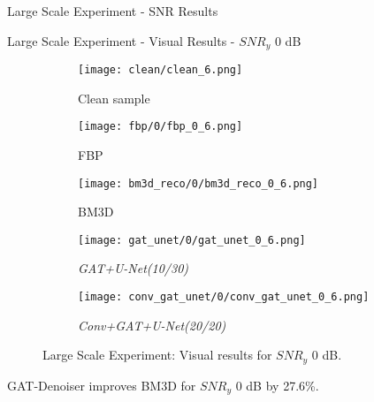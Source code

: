 \begin{frame}{Large Scale Experiment - SNR Results}
    
\end{frame}

\begin{frame}{Large Scale Experiment - Visual Results - $SNR_y$ 0 dB}
\begin{figure}
    \captionsetup[subfigure]{justification=centering}
    \centering
    \begin{subfigure}[t]{0.18\textwidth}
      \texttt{[image: clean/clean\_6.png]}
      \caption{Clean sample}
    \end{subfigure} \hfill
    \begin{subfigure}[t]{0.18\textwidth}
      \texttt{[image: fbp/0/fbp\_0\_6.png]}
      \caption{FBP}
    \end{subfigure} \hfill
    \begin{subfigure}[t]{0.18\textwidth}
      \texttt{[image: bm3d\_reco/0/bm3d\_reco\_0\_6.png]}
      \caption{BM3D}
    \end{subfigure} \hfill
    \begin{subfigure}[t]{0.18\textwidth}
      \texttt{[image: gat\_unet/0/gat\_unet\_0\_6.png]}
      \caption{\textit{GAT+U-Net(10/30)}}
    \end{subfigure} \hfill
    \begin{subfigure}[t]{0.18\textwidth}
      \texttt{[image: conv\_gat\_unet/0/conv\_gat\_unet\_0\_6.png]}
      \caption{\textit{Conv+GAT+U-Net(20/20)}}
    \end{subfigure} \hfill
    \caption{Large Scale Experiment: Visual results for $SNR_y$ 0 dB.}
  \end{figure}
  

  \begin{tcolorbox}[colback=red!5!white,hide=<1>, alert=<2>, colframe=red!75!black]
    GAT-Denoiser improves BM3D for $SNR_y$ 0 dB  by 27.6\%.
    \end{tcolorbox}
    
\end{frame}


